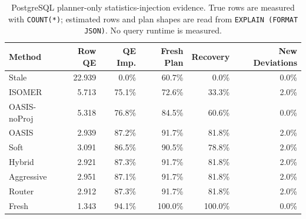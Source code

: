 \begin{table}[t]
  \centering
  \small
  \caption{PostgreSQL planner-only statistics-injection evidence. True rows are measured with \texttt{COUNT(*)}; estimated rows and plan shapes are read from \texttt{EXPLAIN (FORMAT JSON)}. No query runtime is measured.}
  \label{tab:postgres_planner_stats_injection}
  \setlength{\tabcolsep}{4pt}
  \begin{tabular}{lrrrrr}
    \toprule
    Method & Row QE & QE Imp. & Fresh Plan & Recovery & New Deviations \\
    \midrule
    Stale & 22.939 & 0.0\% & 60.7\% & 0.0\% & 0.0\% \\
    ISOMER & 5.713 & 75.1\% & 72.6\% & 33.3\% & 2.0\% \\
    OASIS-noProj & 5.318 & 76.8\% & 84.5\% & 60.6\% & 0.0\% \\
    OASIS & 2.939 & 87.2\% & 91.7\% & 81.8\% & 2.0\% \\
    Soft & 3.091 & 86.5\% & 90.5\% & 78.8\% & 2.0\% \\
    Hybrid & 2.921 & 87.3\% & 91.7\% & 81.8\% & 2.0\% \\
    Aggressive & 2.951 & 87.1\% & 91.7\% & 81.8\% & 2.0\% \\
    Router & 2.912 & 87.3\% & 91.7\% & 81.8\% & 2.0\% \\
    Fresh & 1.343 & 94.1\% & 100.0\% & 100.0\% & 0.0\% \\
    \bottomrule
  \end{tabular}
\end{table}
